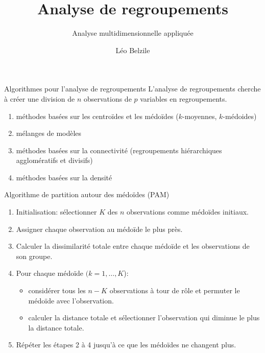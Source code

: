 \documentclass[
  ignorenonframetext,
]{beamer}
\title{Analyse de regroupements}
\subtitle{Analyse multidimensionnelle appliquée}
\author{Léo Belzile}
\date{}
\institute{HEC Montréal}
\providecommand{\tightlist}{%
  \setlength{\itemsep}{0pt}\setlength{\parskip}{0pt}}\usepackage{longtable,booktabs,array}
\begin{document}
\frame{\titlepage}
\ifdefined\Shaded\renewenvironment{Shaded}{\begin{tcolorbox}[borderline west={3pt}{0pt}{shadecolor}, enhanced, boxrule=0pt, breakable, sharp corners, interior hidden, frame hidden]}{\end{tcolorbox}}\fi

\begin{frame}{Algorithmes pour l'analyse de regroupements}
\protect\hypertarget{algorithmes-pour-lanalyse-de-regroupements}{}
L'analyse de regroupements cherche à créer une division de \(n\)
observations de \(p\) variables en regroupements.

\begin{enumerate}
\tightlist
\item
  méthodes basées sur les centroïdes et les médoïdes (\(k\)-moyennes,
  \(k\)-médoides)
\item
  mélanges de modèles
\item
  méthodes basées sur la connectivité (regroupements hiérarchiques
  agglomératifs et divisifs)
\item
  méthodes basées sur la densité
\end{enumerate}
\end{frame}

\begin{frame}{Algorithme de partition autour des médoïdes (PAM)}
\protect\hypertarget{algorithme-de-partition-autour-des-muxe9douxefdes-pam}{}
\begin{enumerate}
\tightlist
\item
  Initialisation: sélectionner \(K\) des \(n\) observations comme
  médoïdes initiaux.
\item
  Assigner chaque observation au médoïde le plus près.
\item
  Calculer la dissimilarité totale entre chaque médoïde et les
  observations de son groupe.
\item
  Pour chaque médoïde \((k=1, \ldots, K\)):

  \begin{itemize}
  \tightlist
  \item
    considérer tous les \(n-K\) observations à tour de rôle et permuter
    le médoïde avec l'observation.\\
  \item
    calculer la distance totale et sélectionner l'observation qui
    diminue le plus la distance totale.
  \end{itemize}
\item
  Répéter les étapes 2 à 4 jusqu'à ce que les médoïdes ne changent plus.
\end{enumerate}
\end{frame}
\end{document}
